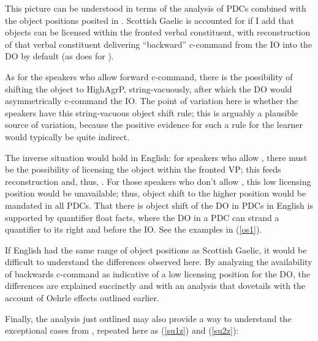 \documentclass[output=paper,colorlinks,citecolor=brown]{langscibook}
\begin{document}
This picture can be understood in terms of the  analysis of PDCs combined with the object positions posited in . Scottish Gaelic is accounted for if I add that objects can be licensed within the fronted verbal constituent, with reconstruction of that verbal constituent delivering “backward” c-command from the IO into the DO by default  (as \citealt{gt:Pearson:2000} does for ). 

As for the speakers who allow forward c-command, there is the possibility of shifting the object to HighAgrP, string-vacuously, after which the DO would asymmetrically c-command the IO. The point of variation here is whether the speakers have this string-vacuous object shift rule; this is arguably a plausible source of variation, because the positive evidence for such a rule for the learner would typically be quite indirect.  


The inverse situation would hold in English: for speakers who allow , there must be the possibility of licensing the object within the fronted VP; this feeds reconstruction and, thus, . For those speakers who don't allow , this low licensing position would be unavailable; thus, object shift to the higher position would be mandated in all PDCs. That there is object shift of the DO in PDCs in English is supported by quantifier float facts, where the DO in a PDC can strand a quantifier to its right and before the IO. See the examples in (\ref{os1}).


\noindent If English had the same range of object positions as Scottish Gaelic, it would be difficult to understand the differences observed here. By analyzing the availability of backwards c-command as indicative of a low licensing position for the DO, the differences are explained succinctly and with an analysis that dovetails with the account of Oehrle effects outlined earlier. 

Finally, the analysis just outlined may also provide a way to understand the exceptional cases from \citet{gt:Pesetsky:1995}, repeated here as (\ref{su1z}) and (\ref{su2z}): 

\end{document}
